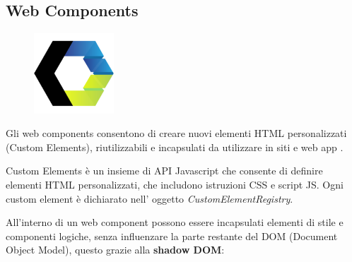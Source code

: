 \subsection{Web Components}
\begin{figure}[H]
    \centering
    \includegraphics[width=30mm]{img/webcomp}
  \end{figure}
Gli web components consentono di creare nuovi elementi HTML personalizzati (Custom Elements), riutilizzabili e incapsulati
da utilizzare in siti e web app \cite{webcomponents}.

Custom Elements è un insieme di API Javascript che consente di definire elementi HTML personalizzati, che includono istruzioni CSS e script JS.
Ogni custom element è dichiarato nell' oggetto \emph{CustomElementRegistry}.
\linebreak

All'interno di un web component possono essere incapsulati elementi di stile e componenti logiche, senza influenzare
la parte restante del DOM (Document Object Model), questo grazie alla \textbf{shadow DOM}:
